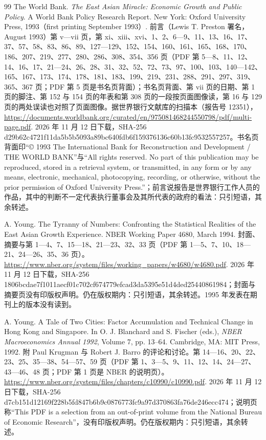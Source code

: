 \begin{thebibliography}{99}
 The World Bank. \emph{The East Asian Miracle: Economic Growth and Public Policy}. A World Bank Policy Research Report. New York: Oxford University Press, 1993（first printing September 1993）. 前言（Lewis T. Preston 署名，August 1993）第 v—vii 页，第 xi、xiii、xvi、1、2、6—9、11、13、16、17、37、57、58、83、86、89、127—129、152、154、160、161、165、168、170、186、207、219、277、280、286、308、354、356 页（PDF 第 5—8、11、12、14、16、17、21—24、26、28、31、32、52、72、73、97、100、103、140—142、165、167、173、174、178、181、183、199、219、231、288、291、297、319、365、367 页；PDF 第 5 页是书名页背面）；书名页背面、第 vii 页的日期、第 1 页的脚注、第 152 与 154 页的年表和第 308 页的一段按页面图像读，第 16 与 129 页的两处误读也对照了页面图像。据世界银行文献库的扫描本（报告号 12351），\url{https://documents.worldbank.org/curated/en/975081468244550798/pdf/multi-page.pdf}. 2026 年 11 月 12 日下载，SHA-256 d29b62c4721f11da5b5b5093a89bc640fdb6f159376136c60b13fc9532557257。书名页背面印“© 1993 The International Bank for Reconstruction and Development / THE WORLD BANK”与“All rights reserved. No part of this publication may be reproduced, stored in a retrieval system, or transmitted, in any form or by any means, electronic, mechanical, photocopying, recording, or otherwise, without the prior permission of Oxford University Press.”；前言说报告是世界银行工作人员的作品，其中的判断不一定代表执行董事会及其所代表的政府的看法：只引短语，其余转述。

 A. Young. The Tyranny of Numbers: Confronting the Statistical Realities of the East Asian Growth Experience. NBER Working Paper 4680, March 1994. 封面、摘要与第 1—4、7、15—18、21—23、32、33 页（PDF 第 1—5、7、10、18—21、24—26、35、36 页）。\url{https://www.nber.org/system/files/working_papers/w4680/w4680.pdf}. 2026 年 11 月 12 日下载，SHA-256 1806bcdae7f1011aecf01c702cf674779efcad3da5395e51d4ded25440861984；封面与摘要页没有印版权声明。仍在版权期内：只引短语，其余转述。1995 年发表在期刊上的版本没有读到。

 A. Young. A Tale of Two Cities: Factor Accumulation and Technical Change in Hong Kong and Singapore. In O. J. Blanchard and S. Fischer (eds.), \emph{NBER Macroeconomics Annual 1992}, Volume 7, pp. 13--64. Cambridge, MA: MIT Press, 1992. 附 Paul Krugman 与 Robert J. Barro 的评论和讨论。第 14—16、20、22、23、25、35—38、54—57、59 页（PDF 第 1、3—5、9、11、12、14、24—27、43—46、48 页；PDF 第 1 页是 NBER 的说明页）。\url{https://www.nber.org/system/files/chapters/c10990/c10990.pdf}. 2026 年 11 月 12 日下载，SHA-256 d7cb151d12169f228b5fd847b6b9c0876773fc9a97d370863fa76de246ecc474；说明页称“This PDF is a selection from an out-of-print volume from the National Bureau of Economic Research”，没有印版权声明。仍在版权期内：只引短语，其余转述。


\end{thebibliography}
